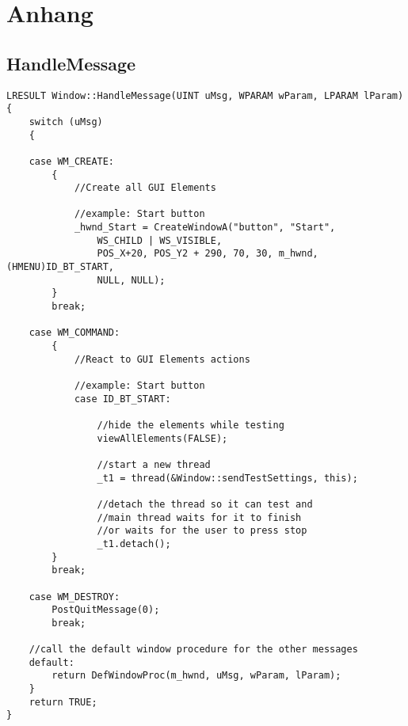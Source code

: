 

\chapter{Anhang}
\section{HandleMessage}\label{HandleMessageCode}
		
\begin{lstlisting}	
LRESULT Window::HandleMessage(UINT uMsg, WPARAM wParam, LPARAM lParam)
{
    switch (uMsg)
    {

    case WM_CREATE:
        {
            //Create all GUI Elements
            
            //example: Start button
            _hwnd_Start = CreateWindowA("button", "Start",
				WS_CHILD | WS_VISIBLE,
				POS_X+20, POS_Y2 + 290, 70, 30, m_hwnd, (HMENU)ID_BT_START,
				NULL, NULL);
        }
        break;
        
    case WM_COMMAND:
        {
            //React to GUI Elements actions
            
            //example: Start button
            case ID_BT_START:

				//hide the elements while testing
				viewAllElements(FALSE);

				//start a new thread
				_t1 = thread(&Window::sendTestSettings, this);
				
				//detach the thread so it can test and
				//main thread waits for it to finish
				//or waits for the user to press stop
				_t1.detach();
        }
        break;
        
    case WM_DESTROY:
        PostQuitMessage(0);
        break;

	//call the default window procedure for the other messages
    default:
        return DefWindowProc(m_hwnd, uMsg, wParam, lParam);
    }
    return TRUE;
}

\end{lstlisting}

